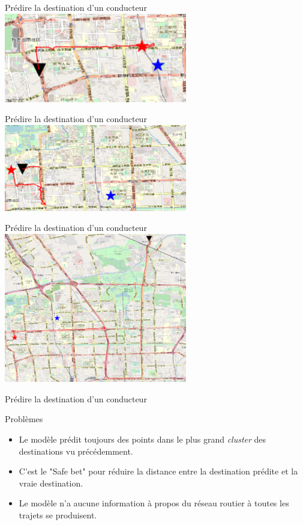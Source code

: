 \documentclass[aspectratio=169]{beamer}
\begin{document}
\begin{frame}{Prédire la destination d'un conducteur}
\centering
\includegraphics[width=0.6\textwidth]{figures/ex2_reg}
\end{frame}

\begin{frame}{Prédire la destination d'un conducteur}
\centering
\includegraphics[width=0.6\textwidth]{figures/ex3_reg}
\end{frame}

\begin{frame}{Prédire la destination d'un conducteur}
\centering
\includegraphics[width=0.6\textwidth]{figures/ex4_reg}
\end{frame}

\begin{frame}{Prédire la destination d'un conducteur}

{\Large Problèmes}

\begin{itemize}
	\item Le modèle prédit toujours des points dans le plus grand \textit{cluster} des destinations vu précédemment.
	\item C'est le "Safe bet" pour réduire la distance entre la destination prédite et la vraie destination.
	\item Le modèle n'a aucune information à propos du réseau routier à toutes les trajets se produisent.
\end{itemize}
\end{frame}
\end{document}

